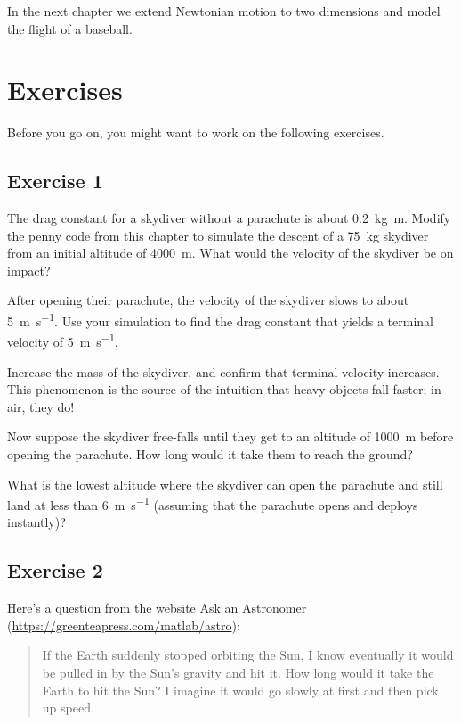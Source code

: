 In the next chapter we extend Newtonian motion to two dimensions and model the flight of a baseball.


\section{Exercises}

Before you go on, you might want to work on the following exercises.

\subsection{Exercise 1}

The drag constant for a skydiver without a parachute is about \SI{0.2}{\kilogram \meter}.  Modify the penny code from this chapter to simulate the descent of a \SI{75}{\kilogram} skydiver from an initial altitude of \SI{4000}{\meter}.  What would the velocity of the skydiver be on impact?

After opening their parachute, the velocity of the skydiver slows to about \SI{5}{\meter\per\second}.  Use your simulation to find the drag constant that yields a terminal velocity of \SI{5}{\meter\per\second}.

Increase the mass of the skydiver, and confirm that terminal velocity increases.  This phenomenon is the source of the intuition that heavy objects fall faster; in air, they do!

Now suppose the skydiver free-falls until they get to an altitude of \SI{1000}{\meter} before opening the parachute.  How long would it take them to reach the ground?

What is the lowest altitude where the skydiver can open the parachute and still land at less than \SI{6}{\meter\per\second} (assuming that the parachute opens and deploys instantly)?





\subsection{Exercise 2}
\label{earth}


Here's a question from the website {Ask an Astronomer} (\url{https://greenteapress.com/matlab/astro}):

\begin{quote}
If the Earth suddenly stopped orbiting the Sun, I know eventually it would be pulled in by the Sun's gravity and hit it. How long would it take the Earth to hit the Sun? I imagine it would go slowly at first and then pick up speed.
\end{quote}

